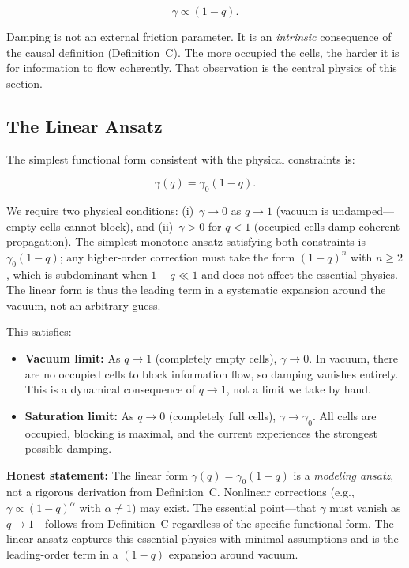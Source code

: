 \documentclass[aps,prd,twocolumn,showpacs,superscriptaddress,preprintnumbers]{revtex4-2}
\begin{document}
\begin{equation}
\gamma \propto (1-q).
\label{eq:gamma_scaling}
\end{equation}

Damping is not an external friction parameter.
It is an \emph{intrinsic} consequence of the causal definition (Definition~C).
The more occupied the cells, the harder it is for information to flow coherently.
That observation is the central physics of this section.

\subsection{The Linear Ansatz}

The simplest functional form consistent with the physical constraints is:

\begin{equation}
\boxed{\gamma(q) = \gamma_0 (1-q)}.
\label{eq:gamma_linear}
\end{equation}

We require two physical conditions: (i)~$\gamma\to0$ as $q\to1$ (vacuum is undamped---empty cells cannot block), and (ii)~$\gamma>0$ for $q<1$ (occupied cells damp coherent propagation). The simplest monotone ansatz satisfying both constraints is $\gamma_0(1-q)$; any higher-order correction must take the form $(1-q)^n$ with $n\ge2$, which is subdominant when $1-q\ll1$ and does not affect the essential physics. The linear form is thus the leading term in a systematic expansion around the vacuum, not an arbitrary guess.

This satisfies:

\begin{itemize}
    \item \textbf{Vacuum limit:} As $q\to 1$ (completely empty cells), $\gamma\to 0$. In vacuum, there are no occupied cells to block information flow, so damping vanishes entirely. This is a dynamical consequence of $q\to 1$, not a limit we take by hand.
    \item \textbf{Saturation limit:} As $q\to 0$ (completely full cells), $\gamma\to\gamma_0$. All cells are occupied, blocking is maximal, and the current experiences the strongest possible damping.
\end{itemize}

\textbf{Honest statement:} The linear form $\gamma(q)=\gamma_0(1-q)$ is a \emph{modeling ansatz}, not a rigorous derivation from Definition~C.
Nonlinear corrections (e.g., $\gamma\propto(1-q)^\alpha$ with $\alpha\neq 1$) may exist.
The essential point---that $\gamma$ must vanish as $q\to 1$---follows from Definition~C regardless of the specific functional form.
The linear ansatz captures this essential physics with minimal assumptions and is the leading-order term in a $(1-q)$ expansion around vacuum.
\end{document}
